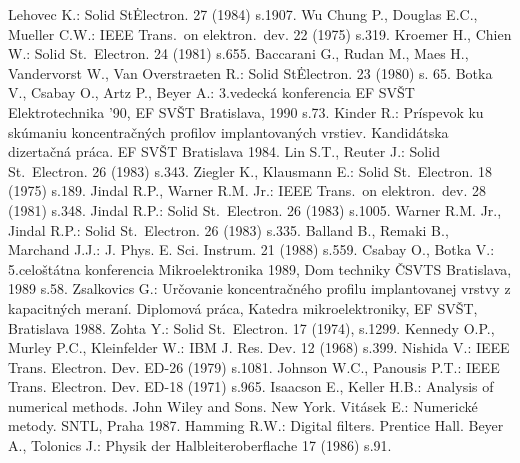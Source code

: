 \begin{thebibliography}{}
 Lehovec K.: Solid St\.  Electron.  27 (1984)
  s.1907.
 Wu Chung P., Douglas E.C., Mueller C.W.: IEEE
  Trans.\ on elektron.\ dev. 22 (1975) s.319.
 Kroemer H., Chien W.: Solid St.\ Electron. 24
  (1981) s.655.
 Baccarani G., Rudan M., Maes H., Vandervorst W.,
  Van Overstraeten R.: Solid St\. Electron. 23 (1980) s. 65.
 Botka V., Csabay O., Artz P., Beyer A.: 3.vedecká
  konferencia EF SVŠT Elektrotechnika '90, EF SVŠT Bratislava, 1990
  s.73.
 Kinder R.: Príspevok ku skúmaniu koncentračných
  profilov implantovaných vrstiev. Kandidátska dizertačná práca. EF
  SVŠT Bratislava 1984.
 Lin S.T., Reuter J.: Solid St.\ Electron. 26 (1983)
  s.343.
 Ziegler K., Klausmann E.: Solid St.\ Electron. 18
  (1975) s.189.
 Jindal R.P., Warner R.M. Jr.: IEEE Trans.\ on
  elektron.\ dev. 28 (1981) s.348.
 Jindal R.P.: Solid St.\ Electron. 26 (1983)
  s.1005.
 Warner R.M. Jr., Jindal R.P.: Solid
  St.\ Electron. 26 (1983) s.335.
 Balland B., Remaki B., Marchand J.J.:
  J. Phys. E. Sci. Instrum. 21 (1988) s.559.
 Csabay O., Botka V.: 5.celoštátna konferencia
  Mikroelektronika 1989, Dom techniky ČSVTS Bratislava, 1989 s.58.
 Zsalkovics G.: Určovanie koncentračného profilu
  implantovanej vrstvy z kapacitných meraní. Diplomová práca, Katedra
  mikroelektroniky, EF SVŠT, Bratislava 1988.
 Zohta Y.: Solid St.\ Electron. 17 (1974), s.1299.
 Kennedy O.P., Murley P.C., Kleinfelder W.: IBM
  J. Res. Dev. 12 (1968) s.399.
 Nishida V.: IEEE Trans. Electron. Dev. ED-26
  (1979) s.1081.
 Johnson W.C., Panousis P.T.: IEEE
  Trans. Electron. Dev. ED-18 (1971) s.965.
 Isaacson E., Keller H.B.: Analysis of numerical
  methods.  John Wiley and Sons. New York.
 Vitásek E.: Numerické metody. SNTL, Praha 1987.
 Hamming R.W.: Digital filters. Prentice Hall.
 Beyer A., Tolonics J.: Physik der
  Halbleiteroberflache 17 (1986) s.91.
\end{thebibliography}
